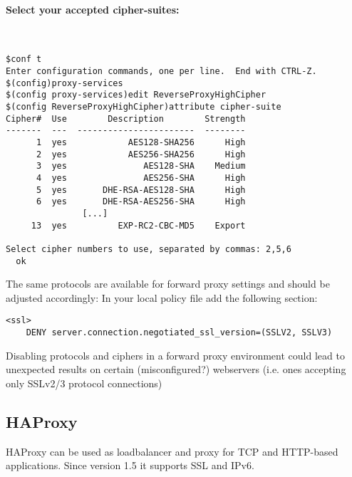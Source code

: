 \paragraph*{Select your accepted cipher-suites:}
~
\begin{lstlisting}
$conf t
Enter configuration commands, one per line.  End with CTRL-Z.
$(config)proxy-services
$(config proxy-services)edit ReverseProxyHighCipher
$(config ReverseProxyHighCipher)attribute cipher-suite
Cipher#  Use        Description        Strength
-------  ---  -----------------------  --------
      1  yes            AES128-SHA256      High
      2  yes            AES256-SHA256      High
      3  yes               AES128-SHA    Medium
      4  yes               AES256-SHA      High
      5  yes       DHE-RSA-AES128-SHA      High
      6  yes       DHE-RSA-AES256-SHA      High
               [...]
     13  yes          EXP-RC2-CBC-MD5    Export

Select cipher numbers to use, separated by commas: 2,5,6
  ok
\end{lstlisting}

The same protocols are available for forward proxy settings and should be adjusted accordingly:
In your local policy file add the following section:
\begin{lstlisting}
<ssl>
    DENY server.connection.negotiated_ssl_version=(SSLV2, SSLV3)
\end{lstlisting}

Disabling protocols and ciphers in a forward proxy environment could lead to unexpected results on certain (misconfigured?) webservers (i.e. ones accepting only SSLv2/3 protocol connections)


\subsection{HAProxy}

HAProxy can be used as loadbalancer and proxy for TCP and HTTP-based applications. Since version 1.5 it supports SSL and IPv6.

